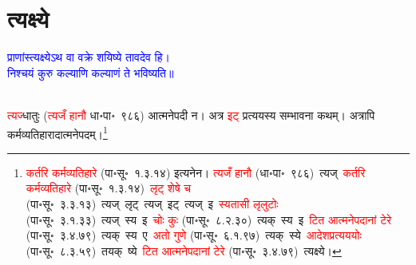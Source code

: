 \section[त्यक्ष्ये]{त्यक्ष्ये}
\centering\textcolor{blue}{प्राणांस्त्यक्ष्येऽथ वा वक्रे शयिष्ये तावदेव हि।\nopagebreak\\
निश्चयं कुरु कल्याणि कल्याणं ते भविष्यति॥}\nopagebreak\\
\\
\fontsize{14}{21}\selectfont\begin{sloppypar}\justifying\noindent\hspace{10mm} \textcolor{red}{त्यज्}\-धातुः (\textcolor{red}{त्यजँ हानौ} धा॰पा॰~९८६) आत्मनेपदी न। अत्र \textcolor{red}{इट्} प्रत्ययस्य सम्भावना कथम्। अत्रापि कर्मव्यतिहारादात्मनेपदम्।\footnote{\textcolor{red}{कर्तरि कर्मव्यतिहारे} (पा॰सू॰~१.३.१४) इत्यनेन। \textcolor{red}{त्यजँ हानौ} (धा॰पा॰~९८६)~\arrow त्यज्~\arrow \textcolor{red}{कर्तरि कर्मव्यतिहारे} (पा॰सू॰~१.३.१४)~\arrow \textcolor{red}{लृट् शेषे च} (पा॰सू॰~३.३.१३)~\arrow त्यज्~लृट्~\arrow त्यज्~इट्~\arrow त्यज्~इ~\arrow \textcolor{red}{स्यतासी लृलुटोः} (पा॰सू॰~३.१.३३)~\arrow त्यज्~स्य~इ~\arrow \textcolor{red}{चोः कुः} (पा॰सू॰~८.२.३०)~\arrow त्यक्~स्य~इ~\arrow \textcolor{red}{टित आत्मनेपदानां टेरे} (पा॰सू॰~३.४.७९)~\arrow त्यक्~स्य~ए~\arrow \textcolor{red}{अतो गुणे} (पा॰सू॰~६.१.९७)~\arrow त्यक्~स्ये~\arrow \textcolor{red}{आदेश\-प्रत्यययोः} (पा॰सू॰~८.३.५९)~\arrow तयक्~ष्ये~\arrow \textcolor{red}{टित आत्मनेपदानां टेरे} (पा॰सू॰~३.४.७९)~\arrow त्यक्ष्ये।}\end{sloppypar}
